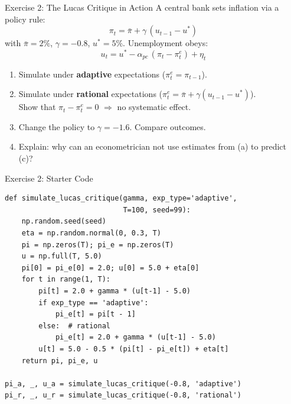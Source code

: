 \documentclass[aspectratio=169, 10pt]{beamer}
\begin{document}
\begin{frame}{Exercise 2: The Lucas Critique in Action}
A central bank sets inflation via a policy rule:
\[
  \pi_t = \bar{\pi} + \gamma\,(u_{t-1} - u^*)
\]
with $\bar{\pi} = 2\%$, $\gamma = -0.8$, $u^* = 5\%$.
Unemployment obeys:
\[
  u_t = u^* - \alpha_{pc}\,(\pi_t - \pi^e_t) + \eta_t
\]
\vspace{0.3em}
\begin{enumerate}
  \item[(a)] Simulate under \textbf{adaptive} expectations ($\pi^e_t = \pi_{t-1}$).
  \item[(b)] Simulate under \textbf{rational} expectations
        ($\pi^e_t = \bar{\pi} + \gamma(u_{t-1} - u^*)$).\\
        Show that $\pi_t - \pi^e_t = 0$ $\Rightarrow$ no systematic effect.
  \item[(c)] Change the policy to $\gamma = -1.6$. Compare outcomes.
  \item[(d)] Explain: why can an econometrician not use estimates from (a)
        to predict (c)?
\end{enumerate}
\end{frame}

\begin{frame}[fragile]{Exercise 2: Starter Code}
\begin{lstlisting}
def simulate_lucas_critique(gamma, exp_type='adaptive',
                            T=100, seed=99):
    np.random.seed(seed)
    eta = np.random.normal(0, 0.3, T)
    pi = np.zeros(T); pi_e = np.zeros(T)
    u = np.full(T, 5.0)
    pi[0] = pi_e[0] = 2.0; u[0] = 5.0 + eta[0]
    for t in range(1, T):
        pi[t] = 2.0 + gamma * (u[t-1] - 5.0)
        if exp_type == 'adaptive':
            pi_e[t] = pi[t - 1]
        else:  # rational
            pi_e[t] = 2.0 + gamma * (u[t-1] - 5.0)
        u[t] = 5.0 - 0.5 * (pi[t] - pi_e[t]) + eta[t]
    return pi, pi_e, u

pi_a, _, u_a = simulate_lucas_critique(-0.8, 'adaptive')
pi_r, _, u_r = simulate_lucas_critique(-0.8, 'rational')
\end{lstlisting}
\end{frame}
\end{document}
